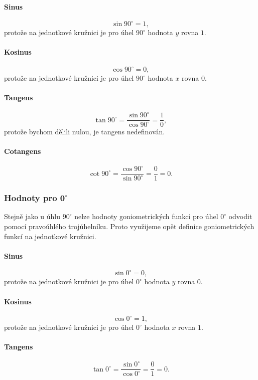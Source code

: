 \documentclass[12pt,a4paper]{article}
\begin{document}
\paragraph{Sinus}
\[\sin 90^\circ = 1,\]
protože na jednotkové kružnici je pro úhel $90^\circ$ hodnota $y$ rovna $1$.

\paragraph{Kosinus}
\[\cos 90^\circ = 0,\]
protože na jednotkové kružnici je pro úhel $90^\circ$ hodnota $x$ rovna $0$.

\paragraph{Tangens}
\[
\tan 90^\circ
= \frac{\sin 90^\circ}{\cos 90^\circ}
= \frac{1}{0},
\]
protože bychom dělili nulou, je tangens nedefinován.

\paragraph{Cotangens}
\[
\cot 90^\circ
= \frac{\cos 90^\circ}{\sin 90^\circ}
= \frac{0}{1} = 0.
\]


\subsubsection*{Hodnoty pro $\boldsymbol{0^\circ}$}
Stejně jako u úhlu $90^\circ$ nelze hodnoty goniometrických funkcí pro úhel $0^\circ$ odvodit pomocí pravoúhlého trojúhelníku.
Proto využijeme opět definice goniometrických funkcí na jednotkové kružnici.

\paragraph{Sinus}
\[\sin 0^\circ = 0,\]
protože na jednotkové kružnici je pro úhel $0^\circ$ hodnota $y$ rovna $0$.

\paragraph{Kosinus}
\[\cos 0^\circ = 1,\]
protože na jednotkové kružnici je pro úhel $0^\circ$ hodnota $x$ rovna $1$.

\paragraph{Tangens}
\[
\tan 0^\circ
= \frac{\sin 0^\circ}{\cos 0^\circ}
= \frac{0}{1} = 0.
\]
\end{document}
